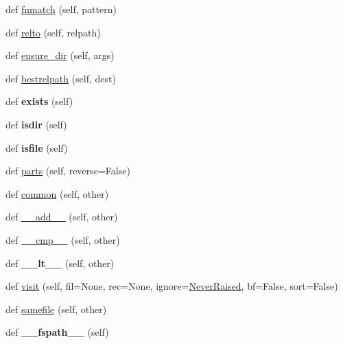 \begin{DoxyCompactItemize}
\item 
def \hyperlink{classpy_1_1__path_1_1common_1_1_path_base_a4994ef31db0ee77c424bac2e42314b78}{fnmatch} (self, pattern)
\item 
def \hyperlink{classpy_1_1__path_1_1common_1_1_path_base_a0ce740f9f787fca8752c06339fd559c0}{relto} (self, relpath)
\item 
def \hyperlink{classpy_1_1__path_1_1common_1_1_path_base_a7a47dc12976133879e1488b0bb4e6589}{ensure\+\_\+dir} (self, args)
\item 
def \hyperlink{classpy_1_1__path_1_1common_1_1_path_base_af63153592c9252a6ead51fc358ae479b}{bestrelpath} (self, dest)
\item 
\mbox{\label{classpy_1_1__path_1_1common_1_1_path_base_a3ccfc73380b0c88de0947a596e2023b9}} 
def {\bfseries exists} (self)
\item 
\mbox{\label{classpy_1_1__path_1_1common_1_1_path_base_a26ed7c31cd76728aadadd4179630d904}} 
def {\bfseries isdir} (self)
\item 
\mbox{\label{classpy_1_1__path_1_1common_1_1_path_base_a6199da333aae2ae981974c6c803c563c}} 
def {\bfseries isfile} (self)
\item 
def \hyperlink{classpy_1_1__path_1_1common_1_1_path_base_a799edfd96b4e8ff890d395287fd272f5}{parts} (self, reverse=False)
\item 
def \hyperlink{classpy_1_1__path_1_1common_1_1_path_base_a6120a4b3b7fab85bb59f60e50679b021}{common} (self, other)
\item 
def \hyperlink{classpy_1_1__path_1_1common_1_1_path_base_aa3e06f5d626ab9eb89ddd150fee78423}{\+\_\+\+\_\+add\+\_\+\+\_\+} (self, other)
\item 
def \hyperlink{classpy_1_1__path_1_1common_1_1_path_base_ab248201116fa0cff1fb1bdd6e31419bb}{\+\_\+\+\_\+cmp\+\_\+\+\_\+} (self, other)
\item 
\mbox{\label{classpy_1_1__path_1_1common_1_1_path_base_a784af128ed4ea4be414d5dd9a52da043}} 
def {\bfseries \+\_\+\+\_\+lt\+\_\+\+\_\+} (self, other)
\item 
def \hyperlink{classpy_1_1__path_1_1common_1_1_path_base_a0b741bae7d34c1ce321c11fb3939177f}{visit} (self, fil=None, rec=None, ignore=\hyperlink{classpy_1_1__path_1_1common_1_1_never_raised}{Never\+Raised}, bf=False, sort=False)
\item 
def \hyperlink{classpy_1_1__path_1_1common_1_1_path_base_a84210f2ec302ac39f3ac1ef5348471b8}{samefile} (self, other)
\item 
\mbox{\label{classpy_1_1__path_1_1common_1_1_path_base_a930001d4a9690534211076061ed57ea7}} 
def {\bfseries \+\_\+\+\_\+fspath\+\_\+\+\_\+} (self)
\end{DoxyCompactItemize}
